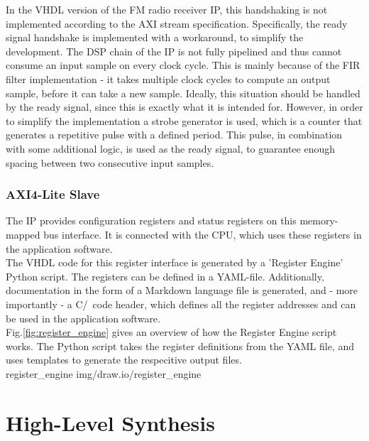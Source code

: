 In the VHDL version of the FM radio receiver IP, this handshaking is not implemented according to the AXI stream specification.
Specifically, the ready signal handshake is implemented with a workaround, to simplify the development.
The DSP chain of the IP is not fully pipelined and thus cannot consume an input sample on every clock cycle.
This is mainly because of the FIR filter implementation - it takes multiple clock cycles to compute an output sample, before it can take a new sample.
Ideally, this situation should be handled by the ready signal, since this is exactly what it is intended for.
However, in order to simplify the implementation a strobe generator is used, which is a counter that generates a repetitive pulse with a defined period.
This pulse, in combination with some additional logic, is used as the ready signal, to guarantee enough spacing between two consecutive input samples.

\subsubsection{AXI4-Lite Slave}

The IP provides configuration registers and status registers on this memory-mapped bus interface.
It is connected with the CPU, which uses these registers in the application software.\\

The VHDL code for this register interface is generated by a 'Register Engine' Python script.
The registers can be defined in a YAML-file.
Additionally, documentation in the form of a Markdown language file is generated, and - more importantly - a C/\cplusplus\ code header, which defines all the register addresses and can be used in the application software.\\

Fig.\ref{fig:register_engine} gives an overview of how the Register Engine script works.
The Python script takes the register definitions from the YAML file, and uses templates to generate the respecitive output files.\\

 {register_engine} {img/draw.io/register_engine}


\section{High-Level Synthesis}

